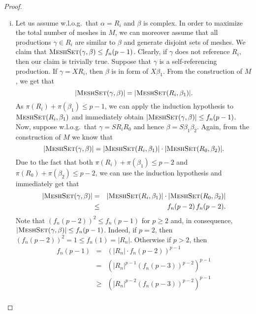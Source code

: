 \documentclass[11pt,a4paper]{amsart}
\theoremstyle{definition}
\newcommand{\MeshSet}[2]{\textsc{MeshSet}(#1,#2)}
\newcommand{\potential}[1]{\pi(#1)}
\begin{document}
\begin{proof}
\begin{enumerate}[(i)]
        \item Let us assume w.l.o.g.~that $\alpha = R_i$ and $\beta$ is complex.
                In order to maximize the total number of meshes in $M$, we can
                moreover assume that all productions $\gamma \in R_i$ are
                similar to $\beta$ and generate disjoint sets of meshes. We claim
                 that $\MeshSet{\gamma}{\beta} \leq f_n(p-1)$. 
                 Clearly,
                 if $\gamma$ does not reference $R_i$, then our claim is trivially true.
                Suppose that $\gamma$ is a self-referencing production. If 
                $\gamma = X R_i$, then $\beta$ is in form of $X \beta_1$.
                From the construction of $M$, we get that \[|\MeshSet{\gamma}{\beta}| =
                 |\MeshSet{R_i}{\beta_1}|.\] As $\potential{R_i} + \potential{\beta_1}
                  \leq p - 1$, we can apply the induction hypothesis to 
                  $\MeshSet{R_i}{\beta_1}$ and immediately obtain 
                  $|\MeshSet{\gamma}{\beta}| \leq f_n(p-1)$. Now, suppose w.l.o.g.~that
                $\gamma = S R_i R_0$ and hence $\beta = S \beta_1 \beta_2$.
                Again, from the construction of $M$ we know that
                \[|\MeshSet{\gamma}{\beta}| = |\MeshSet{R_i}{\beta_1}| \cdot
                |\MeshSet{R_0}{\beta_2}|.\]
                Due to the fact that both $\potential{R_i} + \potential{\beta_1}
                 \leq p - 2$ and $\potential{R_0} + \potential{\beta_2} \leq p - 2$,
                  we can use the induction hypothesis and immediately get that
                \begin{eqnarray*}
                        |\MeshSet{\gamma}{\beta}| &=& |\MeshSet{R_i}{\beta_1}| \cdot
                |\MeshSet{R_0}{\beta_2}|\\
                        &\leq& f_n(p-2)\, f_n(p-2).
                \end{eqnarray*}
                Note that ${(f_n(p-2))}^2 \leq f_n(p-1)$ for $p \geq 2$ and, in
                 consequence, $|\MeshSet{\gamma}{\beta}| \leq f_n(p-1)$. Indeed, 
                 if $p = 2$, then
                 ${(f_n(p-2))}^2 = 1 \leq f_n(1) = |R_n|$. Otherwise if 
                 $p > 2$, then
                \begin{eqnarray*}
                        f_n(p-1) &=& {\left(|R_n| \cdot f_n(p-2)\right)}^{p-1}\\
                                 &=& {\left( {|R_n|}^{p-1} {(f_n(p-3))}^{p-2} \right)}^{p-1}\\
                                 &\geq& {\left( {|R_n|}^{p-2} {(f_n(p-3))}^{p-2} \right)}^{p-1}\\

\end{eqnarray*}
\end{enumerate}
\end{proof}
\end{document}
